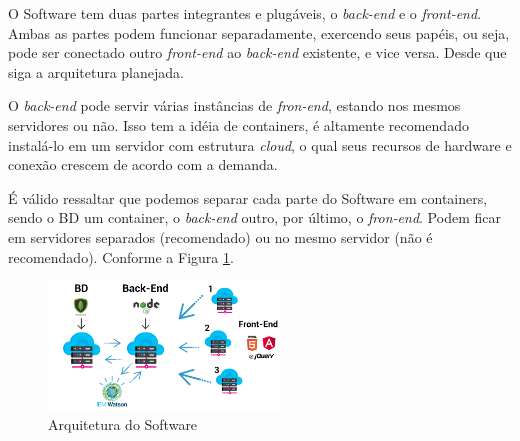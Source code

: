 O Software tem duas partes integrantes e plugáveis, o \textit{back-end} e o \textit{front-end}. Ambas as partes podem funcionar separadamente, exercendo seus papéis, ou seja, pode ser conectado outro \textit{front-end} ao \textit{back-end} existente, e vice versa. Desde que siga a arquitetura planejada.

\par O \textit{back-end} pode servir várias instâncias de \textit{fron-end}, estando nos mesmos servidores ou não. Isso tem a idéia de containers, é altamente recomendado instalá-lo em um servidor com estrutura \textit{cloud}, o qual seus recursos de hardware e conexão crescem de acordo com a demanda.

\par É válido ressaltar que podemos separar cada parte do Software em containers, sendo o BD um container, o \textit{back-end} outro, por último, o \textit{fron-end}. Podem ficar em servidores separados (recomendado) ou no mesmo servidor (não é recomendado). Conforme a Figura \ref{fig:arc}.

\begin{figure}[!ht]
  \centering
      \includegraphics[width=0.55\textwidth]{arc}
  \caption{Arquitetura do Software}
  \label{fig:arc}
\end{figure}